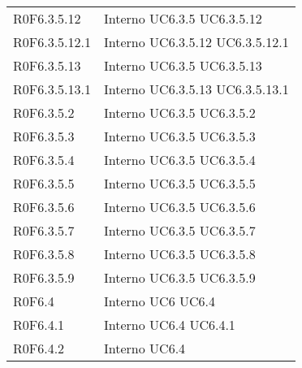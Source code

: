 \begin{longtable}{p{2.5cm}!{\VRule[1pt]}p{2.5cm}}
 \\
R0F6.3.5.12 & Interno \newline UC6.3.5
 \newline UC6.3.5.12
 \\
R0F6.3.5.12.1 & Interno \newline UC6.3.5.12
 \newline UC6.3.5.12.1
 \\
R0F6.3.5.13 & Interno \newline UC6.3.5
 \newline UC6.3.5.13
 \\
R0F6.3.5.13.1 & Interno \newline UC6.3.5.13
 \newline UC6.3.5.13.1
 \\
R0F6.3.5.2 & Interno \newline UC6.3.5
 \newline UC6.3.5.2
 \\
R0F6.3.5.3 & Interno \newline UC6.3.5
 \newline UC6.3.5.3
 \\
R0F6.3.5.4 & Interno \newline UC6.3.5
 \newline UC6.3.5.4
 \\
R0F6.3.5.5 & Interno \newline UC6.3.5
 \newline UC6.3.5.5
 \\
R0F6.3.5.6 & Interno \newline UC6.3.5
 \newline UC6.3.5.6
 \\
R0F6.3.5.7 & Interno \newline UC6.3.5
 \newline UC6.3.5.7
 \\
R0F6.3.5.8 & Interno \newline UC6.3.5
 \newline UC6.3.5.8
 \\
R0F6.3.5.9 & Interno \newline UC6.3.5
 \newline UC6.3.5.9
 \\
R0F6.4 & Interno \newline UC6
 \newline UC6.4
 \\
R0F6.4.1 & Interno \newline UC6.4
 \newline UC6.4.1
 \\
R0F6.4.2 & Interno \newline UC6.4

\end{longtable}
